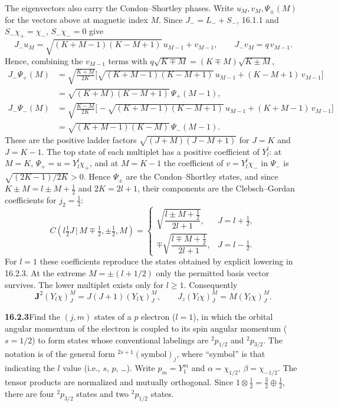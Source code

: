 The eigenvectors also carry the Condon--Shortley phases. Write
$u_M,v_M,\Psi_\pm(M)$ for the vectors above at magnetic index $M$.
Since $J_-=L_-+S_-$, 16.1.1 and $S_-\chi_+=\chi_-$, $S_-\chi_-=0$
give
\[
J_-u_M=\sqrt{(K+M-1)(K-M+1)}\,u_{M-1}+v_{M-1},\qquad
J_-v_M=q\,v_{M-1}.
\]
Hence, combining the $v_{M-1}$ terms with
$q\sqrt{K\mp M}=(K\mp M)\sqrt{K\pm M}$,
\[
\begin{aligned}
J_-\Psi_+(M)&=\sqrt{\tfrac{K+M}{2K}}\bigl[\sqrt{(K+M-1)(K-M+1)}\,u_{M-1}
+(K-M+1)\,v_{M-1}\bigr]\\
&=\sqrt{(K+M)(K-M+1)}\,\Psi_+(M-1),\\
J_-\Psi_-(M)&=\sqrt{\tfrac{K-M}{2K}}\bigl[-\sqrt{(K+M-1)(K-M+1)}\,u_{M-1}
+(K+M-1)\,v_{M-1}\bigr]\\
&=\sqrt{(K+M-1)(K-M)}\,\Psi_-(M-1).
\end{aligned}
\]
These are the positive ladder factors $\sqrt{(J+M)(J-M+1)}$ for $J=K$
and $J=K-1$. The top state of each multiplet has a positive
coefficient of $Y_l^l$: at $M=K$, $\Psi_+=u=Y_l^l\chi_+$, and at
$M=K-1$ the coefficient of $v=Y_l^l\chi_-$ in $\Psi_-$ is
$\sqrt{(2K-1)/2K}>0$. Hence $\Psi_\pm$ are the Condon--Shortley states,
and since $K\pm M=l\pm M+\tfrac12$ and $2K=2l+1$, their components are
the Clebsch--Gordan coefficients for $j_2=\tfrac12$:
\[
C(l\tfrac12J\,|\,M\mp\tfrac12,\pm\tfrac12,M)=
\begin{cases}
\sqrt{\dfrac{l\pm M+\frac12}{2l+1}},&J=l+\tfrac12,\\[2ex]
\mp\sqrt{\dfrac{l\mp M+\frac12}{2l+1}},&J=l-\tfrac12.
\end{cases}
\]
For $l=1$ these coefficients reproduce the states obtained by
explicit lowering in 16.2.3.
At the extreme $M=\pm(l+1/2)$ only the permitted basis vector
survives. The lower multiplet exists only for $l\ge1$.
Consequently
\[
\boxed{\mathbf J^2(Y_l\chi)_J^M=J(J+1)(Y_l\chi)_J^M,\qquad
J_z(Y_l\chi)_J^M=M(Y_l\chi)_J^M}.
\]

\par\bigskip
\noindent\textbf{16.2.3}\quad Find the $(j,m)$ states of a $p$
electron ($l=1$), in which the orbital angular momentum of the
electron is coupled to its spin angular momentum ($s=1/2$) to form
states whose conventional labelings are ${}^{2}p_{1/2}$ and
${}^{2}p_{3/2}$. The notation is of the general form
${}^{2s+1}(\mathrm{symbol})_{j}$, where ``symbol'' is that indicating
the $l$ value (i.e., $s$, $p$, \ldots).
\solution
Write $p_m=Y_1^m$ and $\alpha=\chi_{1/2}$,
$\beta=\chi_{-1/2}$. The tensor products are normalized and mutually
orthogonal. Since $1\otimes\tfrac12=\tfrac32\oplus\tfrac12$,
there are four \( {}^{2}p_{3/2}\) states and two \( {}^{2}p_{1/2}\) states.

